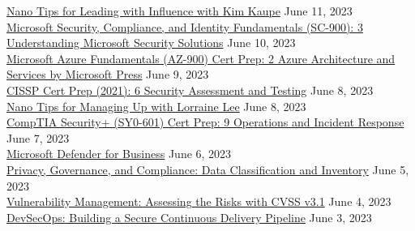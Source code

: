 \documentclass[10pt]{res} %
\begin{document}
\begin{resume}
\href{https://www.linkedin.com/learning/certificates/49b6c9f15a41c9245c258b1e6a0f438b8feb72dde36fdcc6a5ec92a5fcb6c55a}{\color{blue}Nano Tips for Leading with Influence with Kim Kaupe} \hfill June 11, 2023 \\
\href{https://www.linkedin.com/learning/certificates/4fa8557d05ed10c18b1c7999f850be69cc5b3c7907c79635d65f341c5bd0d195}{\color{blue}Microsoft Security, Compliance, and Identity Fundamentals (SC-900): 3 Understanding Microsoft Security Solutions} \hfill June 10, 2023 \\
\href{https://www.linkedin.com/learning/certificates/746d12b1d69719ae4167208b5b4f8e870ab805d6fe78ec94bd705394298ef9a7}{\color{blue}Microsoft Azure Fundamentals (AZ-900) Cert Prep: 2 Azure Architecture and Services by Microsoft Press} \hfill June 9, 2023 \\
\href{https://www.linkedin.com/learning/certificates/ce00d1aaba22b20856de16fa52736fca55a9847b0bacf2d86607626175dbb973}{\color{blue}CISSP Cert Prep (2021): 6 Security Assessment and Testing} \hfill June 8, 2023 \\
\href{https://www.linkedin.com/learning/certificates/71da7607cce5b37969f645b3b1cf0d4daf59c3c383a62799b8c3b8b507feda04}{\color{blue}Nano Tips for Managing Up with Lorraine Lee} \hfill June 8, 2023 \\
\href{https://www.linkedin.com/learning/certificates/3890089313e5c1d96df6e5c3861c656d468403f0c6c90b001f520f8a536bfe0c}{\color{blue}CompTIA Security+ (SY0-601) Cert Prep: 9 Operations and Incident Response} \hfill June 7, 2023 \\
\href{https://www.linkedin.com/learning/certificates/5d176fdbc7ac574c68a3f54f6f83d0c623da52e51a21005ed89ee43a0391c95c}{\color{blue}Microsoft Defender for Business} \hfill June 6, 2023 \\
\href{https://www.linkedin.com/learning/certificates/f16e47af2b1f772938fd48774c77590ad96f0a39c8726cef6a34f8864594d455}{\color{blue}Privacy, Governance, and Compliance: Data Classification and Inventory} \hfill June 5, 2023 \\
\href{https://www.linkedin.com/learning/certificates/6efbc6e0ada6e24baf19d5f8beffed3d579e62703c0dbc185f969885f9d4fdce}{\color{blue}Vulnerability Management: Assessing the Risks with CVSS v3.1} \hfill June 4, 2023 \\
\href{https://www.linkedin.com/learning/certificates/8630eaf9b4b5ca53e254a155c75c380fb0b286f7243c35ae15cf6ef216414d1c}{\color{blue}DevSecOps: Building a Secure Continuous Delivery Pipeline} \hfill June 3, 2023 \\

\end{resume}
\end{document}
